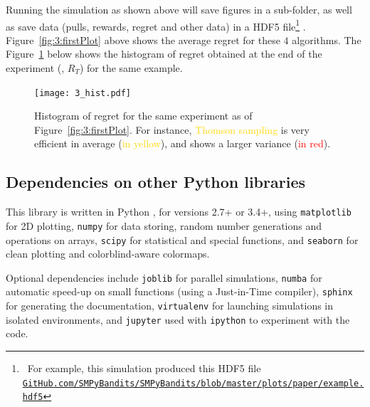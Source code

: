 Running the simulation as shown above will save figures in a sub-folder, as well as save data (pulls, rewards, regret and other data) in a HDF5 file\footnote{~For example, this simulation produced this HDF5 file\\\texttt{\href{https://github.com/SMPyBandits/SMPyBandits/blob/master/plots/paper/example.hdf5}{GitHub.com/SMPyBandits/SMPyBandits/blob/master/plots/paper/example.hdf5}}}
\cite{h5py}.
Figure~\ref{fig:3:firstPlot} above shows the average regret for these $4$ algorithms.
The Figure~\ref{fig:3:firstPlot_hist} below shows the histogram of regret obtained at the end of the experiment (\ie, $R_T$) for the same example.

\begin{figure}[h!]  %
	\centering
	\texttt{[image: 3\_hist.pdf]}
	\caption[Histogram of regret for the same experiment as of Figure~\ref{fig:3:firstPlot}. For instance, Thomson sampling is very efficient in average, and \UCB shows a larger variance.]{Histogram of regret for the same experiment as of Figure~\ref{fig:3:firstPlot}. For instance, \textcolor{gold}{Thomson sampling} is very efficient in average (\textcolor{gold}{in yellow}), and \textcolor{red}{\UCB} shows a larger variance (\textcolor{red}{in red}).}
	\label{fig:3:firstPlot_hist}
\end{figure}


\subsection{Dependencies on other Python libraries}
\label{sub:3:dependencies}

This library is written in Python \cite{python}, for versions 2.7+ or 3.4+, using \texttt{matplotlib} \cite{matplotlib} for 2D plotting, \texttt{numpy} \cite{numpy} for data storing, random number generations and operations on arrays, \texttt{scipy} \cite{scipy} for statistical and special functions, and \texttt{seaborn} \cite{seaborn} for clean plotting and colorblind-aware colormaps.

Optional dependencies include \texttt{joblib} \cite{joblib} for parallel simulations, \texttt{numba} \cite{numba} for automatic speed-up on small functions (using a Just-in-Time compiler), \texttt{sphinx} \cite{sphinx} for generating the documentation, \texttt{virtualenv} \cite{virtualenv} for launching simulations in isolated environments, and \texttt{jupyter} \cite{jupyter} used with \texttt{ipython} \cite{ipython} to experiment with the code.

